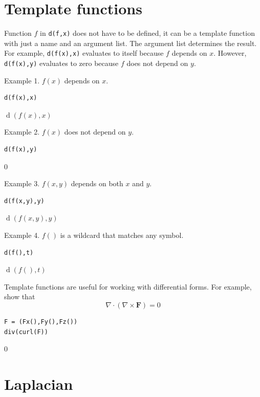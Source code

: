 \documentclass[12pt]{article}
\begin{document}
\newpage

\section{Template functions}

Function $f$ in \verb$d(f,x)$ does not have to be defined,
it can be a template function with just a name and an argument list.
The argument list determines the result.
For example, \verb$d(f(x),x)$ evaluates to itself because $f$ depends on $x$.
However, \verb$d(f(x),y)$ evaluates to zero because $f$ does not depend on $y$.

\bigskip
Example 1. $f(x)$ depends on $x$.

{\color{blue}
\begin{verbatim}
d(f(x),x)
\end{verbatim}}

$\operatorname{d}(f(x),x)$

\bigskip
Example 2. $f(x)$ does not depend on $y$.

{\color{blue}
\begin{verbatim}
d(f(x),y)
\end{verbatim}}

$0$

\bigskip
Example 3. $f(x,y)$ depends on both $x$ and $y$.

{\color{blue}
\begin{verbatim}
d(f(x,y),y)
\end{verbatim}}

$\operatorname{d}(f(x,y),y)$

\bigskip
Example 4. $f()$ is a wildcard that matches any symbol.

{\color{blue}
\begin{verbatim}
d(f(),t)
\end{verbatim}}

$\operatorname{d}(f(),t)$

\bigskip
Template functions are useful for working with differential forms.
For example, show that
\begin{equation*}
\nabla\cdot(\nabla\times\mathbf F)=0
\end{equation*}

{\color{blue}
\begin{verbatim}
F = (Fx(),Fy(),Fz())
div(curl(F))
\end{verbatim}}

$0$

\newpage

\section{Laplacian}
\end{document}
